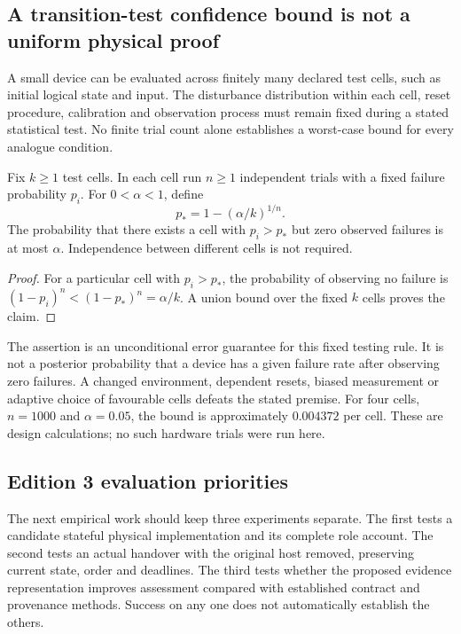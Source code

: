 \subsection{A transition-test confidence bound is not a uniform physical proof}\label{subsec:transitiontest}
A small device can be evaluated across finitely many declared test cells, such as initial logical state and input. The disturbance distribution within each cell, reset procedure, calibration and observation process must remain fixed during a stated statistical test. No finite trial count alone establishes a worst-case bound for every analogue condition.

\begin{proposition}\label{prop:zerofailure}
Fix $k\geq1$ test cells. In each cell run $n\geq1$ independent trials with a fixed failure probability $p_i$. For $0<\alpha<1$, define
\[
 p_*=1-(\alpha/k)^{1/n}.
\]
The probability that there exists a cell with $p_i>p_*$ but zero observed failures is at most $\alpha$. Independence between different cells is not required.
\end{proposition}
\begin{proof}
For a particular cell with $p_i>p_*$, the probability of observing no failure is $(1-p_i)^n<(1-p_*)^n=\alpha/k$. A union bound over the fixed $k$ cells proves the claim.
\end{proof}
The assertion is an unconditional error guarantee for this fixed testing rule. It is not a posterior probability that a device has a given failure rate after observing zero failures. A changed environment, dependent resets, biased measurement or adaptive choice of favourable cells defeats the stated premise. For four cells, $n=1000$ and $\alpha=0.05$, the bound is approximately $0.004372$ per cell. These are design calculations; no such hardware trials were run here.

\subsection{Edition 3 evaluation priorities}
The next empirical work should keep three experiments separate. The first tests a candidate stateful physical implementation and its complete role account. The second tests an actual handover with the original host removed, preserving current state, order and deadlines. The third tests whether the proposed evidence representation improves assessment compared with established contract and provenance methods. Success on any one does not automatically establish the others.

